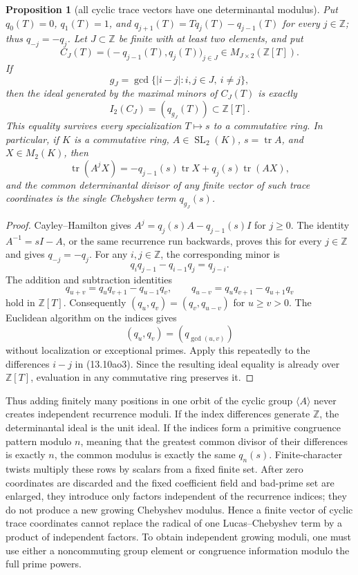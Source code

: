 \documentclass[11pt,reqno]{amsart}
\newtheorem{proposition}[theorem]{Proposition}
\theoremstyle{definition}
\theoremstyle{remark}
\newcommand{\Tr}{\operatorname{tr}}
\newcommand{\SL}{\operatorname{SL}}
\begin{document}
\begin{proposition}[all cyclic trace vectors have one determinantal modulus]
\label{prop:cyclic-trace-determinantal-ideal}
Put \(q_0(T)=0\), \(q_1(T)=1\), and
\(q_{j+1}(T)=Tq_j(T)-q_{j-1}(T)\) for every \(j\in\mathbb Z\);
thus \(q_{-j}=-q_j\).  Let \(J\subset\mathbb Z\) be finite with at least
two elements, and put
\[
 C_J(T)=\bigl(-q_{j-1}(T),q_j(T)\bigr)_{j\in J}
 \in M_{J\times2}(\mathbb Z[T]).
\]
If
\[
 g_J=\gcd\{|i-j|:i,j\in J,\ i\ne j\},
\]
then the ideal generated by the maximal minors of \(C_J(T)\) is exactly
\[
 I_2(C_J)=(q_{g_J}(T))\subset\mathbb Z[T].
\tag{13.10ao1}
\]
This equality survives every specialization \(T\mapsto s\) to a
commutative ring.  In particular, if \(K\) is a commutative ring,
\(A\in\SL_2(K)\),
\(s=\Tr A\), and \(X\in M_2(K)\), then
\[
 \Tr(A^jX)
 =-q_{j-1}(s)\Tr X+q_j(s)\Tr(AX),
\tag{13.10ao2}
\]
and the common determinantal divisor of any finite vector of such trace
coordinates is the single Chebyshev term \(q_{g_J}(s)\).
\end{proposition}

\begin{proof}
Cayley--Hamilton gives
\(A^j=q_j(s)A-q_{j-1}(s)I\) for \(j\ge0\).
The identity \(A^{-1}=sI-A\), or the same recurrence run backwards,
proves this for every \(j\in\mathbb Z\) and gives \(q_{-j}=-q_j\).
For any \(i,j\in\mathbb Z\), the corresponding minor is
\[
 q_iq_{j-1}-q_{i-1}q_j=q_{j-i}.
\tag{13.10ao3}
\]
The addition and subtraction identities
\[
 q_{u+v}=q_uq_{v+1}-q_{u-1}q_v,\qquad
 q_{u-v}=q_uq_{v+1}-q_{u+1}q_v
\tag{13.10ao4}
\]
hold in \(\mathbb Z[T]\).  Consequently
\((q_u,q_v)=(q_v,q_{u-v})\) for \(u\ge v>0\).
The Euclidean algorithm on the indices gives
\[
 (q_u,q_v)=(q_{\gcd(u,v)})
\]
without localization or exceptional primes.  Apply this repeatedly to the
differences \(i-j\) in (13.10ao3).  Since the resulting ideal equality is
already over \(\mathbb Z[T]\), evaluation in any commutative ring preserves
it.
\end{proof}

Thus adding finitely many positions in one orbit of the cyclic group
\(\langle A\rangle\) never creates independent recurrence moduli.  If the
index differences generate \(\mathbb Z\), the determinantal ideal is the
unit ideal.  If the indices form a primitive congruence pattern modulo
\(n\), meaning that the greatest common divisor of their differences is
exactly \(n\), the common modulus is exactly the same \(q_n(s)\).
Finite-character twists multiply these rows by scalars from a fixed finite
set.  After zero coordinates are discarded and the fixed coefficient field
and bad-prime set are enlarged, they introduce only factors independent of
the recurrence indices; they do not produce a new growing Chebyshev modulus.
Hence a finite vector of cyclic trace coordinates cannot replace the radical
of one Lucas--Chebyshev term by a product of independent factors.  To obtain
independent growing moduli, one must use either a noncommuting group element
or congruence information modulo the full prime powers.
\end{document}
